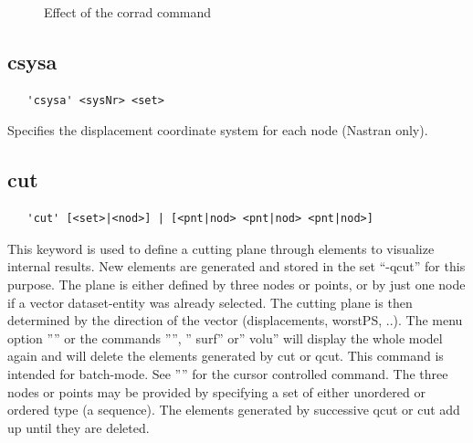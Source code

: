 \documentclass{article}
\begin{document}
\begin{figure}[h]
\caption{\label{corradp} Effect of the corrad command }
\end{figure}

\subsection{\label{csysa}csysa}
\begin{verbatim}
   'csysa' <sysNr> <set>                                                               
\end{verbatim}
Specifies the displacement coordinate system for each node (Nastran only).

\subsection{\label{cut}cut}
\begin{verbatim}
   'cut' [<set>|<nod>] | [<pnt|nod> <pnt|nod> <pnt|nod>]
\end{verbatim}
This keyword is used to define a cutting plane through elements to visualize internal results. New elements are generated and stored in the set ``-qcut'' for this purpose. The plane is either defined by three nodes or points, or by just one node if a vector dataset-entity was already selected. The cutting plane is then determined by the direction of the vector (displacements, worstPS, ..). The menu option '''' or the commands '''', '' surf'' or'' volu'' will display the whole model again and will delete the elements generated by cut or qcut. This command is intended for batch-mode. See '''' for the cursor controlled command. The three nodes or points may be provided by specifying a set of either unordered or ordered type (a sequence). The elements generated by successive qcut or cut add up until they are deleted.
\end{document}
